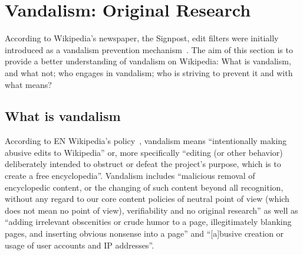 \section{Vandalism: Original Research}
According to Wikipedia's newspaper, the Signpost, edit filters were initially introduced as a vandalism prevention mechanism~\cite{Signpost2009}.
The aim of this section is to provide a better understanding of vandalism on Wikipedia: What is vandalism, and what not; who engages in vandalism; who is striving to prevent it and with what means?

\subsection{What is vandalism}

According to EN Wikipedia's policy~\cite{Wikipedia:Vandalism}, vandalism means ``intentionally making abusive edits to Wikipedia'' or, more specifically ``editing (or other behavior) deliberately intended to obstruct or defeat the project's purpose, which is to create a free encyclopedia''.
Vandalism includes ``malicious removal of encyclopedic content, or the changing of such content beyond all recognition, without any regard to our core content policies of neutral point of view (which does not mean no point of view), verifiability and no original research''
as well as ``adding irrelevant obscenities or crude humor to a page, illegitimately blanking pages, and inserting obvious nonsense into a page''
and ``[a]busive creation or usage of user accounts and IP addresses''.

